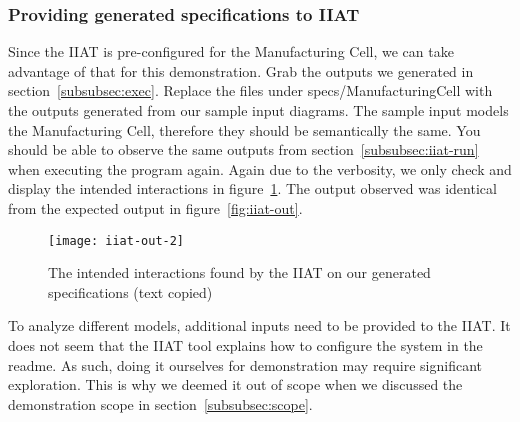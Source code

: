 \subsubsection{Providing generated specifications to IIAT}
Since the IIAT is pre-configured for the Manufacturing Cell,
we can take advantage of that for this demonstration.
Grab the outputs we generated in section~\ref{subsubsec:exec}.
Replace the files under specs/ManufacturingCell with the outputs generated from our sample input diagrams.
The sample input models the Manufacturing Cell, therefore they should be semantically the same.
You should be able to observe the same outputs from section~\ref{subsubsec:iiat-run} when executing the program again.
Again due to the verbosity, we only check and display the intended interactions in figure~\ref{fig:iiat-out2}.
The output observed was identical from the expected output in figure~\ref{fig:iiat-out}.
\begin{figure}[ht]
    \centering
    \texttt{[image: iiat-out-2]}
    \caption{The intended interactions found by the IIAT on our generated specifications (text copied)}
    \label{fig:iiat-out2}
\end{figure}
To analyze different models, additional inputs need to be provided to the IIAT\@.
It does not seem that the IIAT tool explains how to configure the system in the readme.
As such, doing it ourselves for demonstration may require significant exploration.
This is why we deemed it out of scope when we discussed the demonstration scope in section~\ref{subsubsec:scope}.